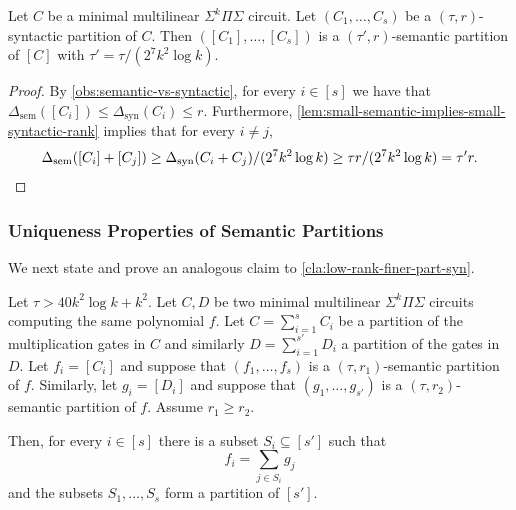 \documentclass[12pt]{article}
\newcommand{\Sps}[1]{\Sigma^{#1} \Pi\Sigma}
\newcommand{\ranksyn}{\Delta_{\text{syn}}}
\newcommand{\ranksem}{\Delta_{\text{sem}}}
\begin{document}
	\begin{corollary}\label{cor:syn-is-sem}
		Let $C$ be a minimal multilinear $\Sps{k}$ circuit.
		Let $(C_1, \ldots, C_s)$ be a $(\tau,r)$-syntactic partition of $C$. Then $([C_1], \ldots, [C_s])$ is a $(\tau',r)$-semantic partition of $[C]$ with $\tau'=\tau/ (2^7 k^2 \log k)$.
	\end{corollary}
	\begin{proof}
		By \autoref{obs:semantic-vs-syntactic}, for every $i \in [s]$ we have that $\ranksem([C_i]) \le \ranksyn(C_i) \le r$.
		Furthermore, \autoref{lem:small-semantic-implies-small-syntactic-rank} implies that for every $i \neq j$,
		\[
		\ranksem([C_i] + [C_j]) \ge \ranksyn(C_i + C_j) / (2^7 k^2 \log k) \ge \tau r / (2^7 k^2 \log k) = \tau' r.  \qedhere
		\]
	\end{proof}
		
	
	\subsubsection{Uniqueness Properties of Semantic Partitions}
	\label{sec:unique-semantic-partition}
	
	We next state and prove an analogous claim to \autoref{cla:low-rank-finer-part-syn}.
	
	\begin{claim}
		\label{cla:low-rank-finer-part}
		Let $\tau >40 k^2 \log k + k^2$.
		Let $C, D$ be two minimal multilinear $\Sps{k}$ circuits computing the same polynomial $f$. Let $C=\sum_{i=1}^{s}C_i$ be a partition of the multiplication gates in $C$ and similarly $D=\sum_{i=1}^{s'}D_i$ a partition of the gates in $D$.
		Let $f_i = [C_i]$ and suppose that $(f_1, \ldots, f_s)$ is a $(\tau,r_1)$-semantic partition of $f$. Similarly, let $g_i = [D_i]$ and suppose that $(g_1, \ldots, g_{s'})$ is a $(\tau, r_2)$-semantic partition of $f$. Assume $r_1 \ge r_2$. 
		
		Then, for every $i \in [s]$ there is a subset $S_i \subseteq [s']$ such that
		\[
		f_i = \sum_{j \in S_i} g_j
		\]
		and the subsets $S_1, \ldots, S_s$ form a partition of $[s']$.
	\end{claim}
	
\end{document}
